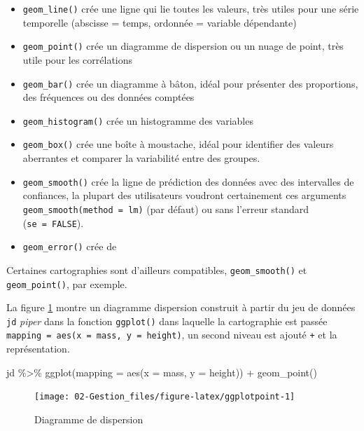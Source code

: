 \documentclass[
]{book}
\newenvironment{Shaded}{}{}
\newcommand{\AttributeTok}[1]{#1}
\newcommand{\FunctionTok}[1]{#1}
\newcommand{\NormalTok}[1]{#1}
\newcommand{\SpecialCharTok}[1]{#1}
\begin{document}
\begin{itemize}
\item
  \texttt{geom\_line()} crée une ligne qui lie toutes les valeurs, très utiles pour une série temporelle (abscisse = temps, ordonnée = variable dépendante)
\item
  \texttt{geom\_point()} crée un diagramme de dispersion ou un nuage de point, très utile pour les corrélations
\item
  \texttt{geom\_bar()} crée un diagramme à bâton, idéal pour présenter des proportions, des fréquences ou des données comptées
\item
  \texttt{geom\_histogram()} crée un histogramme des variables
\item
  \texttt{geom\_box()} crée une boîte à moustache, idéal pour identifier des valeurs aberrantes et comparer la variabilité entre des groupes.
\item
  \texttt{geom\_smooth()} crée la ligne de prédiction des données avec des intervalles de confiances, la plupart des utilisateurs voudront certainement ces arguments \texttt{geom\_smooth(method\ =\ lm)} (par défaut) ou sans l'erreur standard (\texttt{se\ =\ FALSE}).
\item
  \texttt{geom\_error()} crée de
\end{itemize}

Certaines cartographies sont d'ailleurs compatibles, \texttt{geom\_smooth()} et \texttt{geom\_point()}, par exemple.

La figure \ref{fig:ggplotpoint} montre un diagramme dispersion construit à partir du jeu de données \texttt{jd} \emph{piper} dans la fonction \texttt{ggplot()} dans laquelle la cartographie est passée \texttt{mapping\ =\ aes(x\ =\ mass,\ y\ =\ height)}, un second niveau est ajouté \texttt{+} et la représentation.

\begin{Shaded}
\begin{Highlighting}[]
\NormalTok{jd }\SpecialCharTok{\%\textgreater{}\%} 
  \FunctionTok{ggplot}\NormalTok{(}\AttributeTok{mapping =} \FunctionTok{aes}\NormalTok{(}\AttributeTok{x =}\NormalTok{ mass, }\AttributeTok{y =}\NormalTok{ height)) }\SpecialCharTok{+} 
  \FunctionTok{geom\_point}\NormalTok{()}
\end{Highlighting}
\end{Shaded}

\begin{figure}

{\centering \texttt{[image: 02-Gestion\_files/figure-latex/ggplotpoint-1]} 

}

\caption{Diagramme de dispersion}\label{fig:ggplotpoint}
\end{figure}
\end{document}

